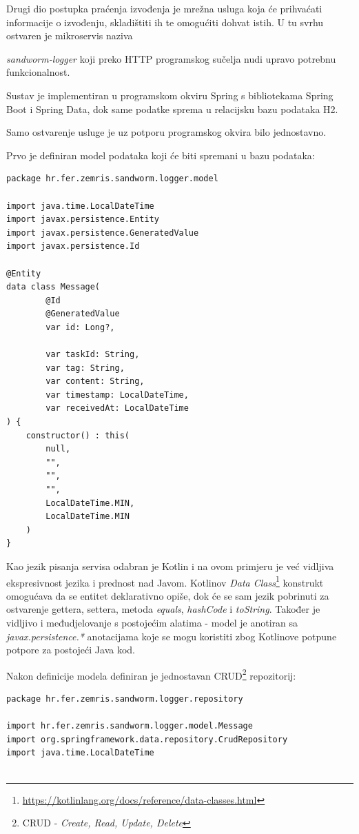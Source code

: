 \documentclass[times, utf8, zavrsni]{fer}
\begin{document}
Drugi dio postupka praćenja izvođenja je mrežna usluga koja će prihvaćati informacije o izvođenju, skladištiti ih te omogućiti dohvat istih. U tu svrhu ostvaren je mikroservis naziva {\textit{sandworm-logger} koji preko HTTP programskog sučelja nudi upravo potrebnu funkcionalnost.

Sustav je implementiran u programskom okviru Spring s bibliotekama Spring Boot i Spring Data, dok same podatke sprema u relacijsku bazu podataka H2.

Samo ostvarenje usluge je uz potporu programskog okvira bilo jednostavno.

Prvo je definiran model podataka koji će biti spremani u bazu podataka:

\begin{lstlisting}
package hr.fer.zemris.sandworm.logger.model

import java.time.LocalDateTime
import javax.persistence.Entity
import javax.persistence.GeneratedValue
import javax.persistence.Id

@Entity
data class Message(
        @Id
        @GeneratedValue
        var id: Long?,

        var taskId: String,
        var tag: String,
        var content: String,
        var timestamp: LocalDateTime,
        var receivedAt: LocalDateTime
) {
    constructor() : this(
	 	null,
		"",
		"",
		"",
		LocalDateTime.MIN,
		LocalDateTime.MIN
	)
}
\end{lstlisting}

Kao jezik pisanja servisa odabran je Kotlin i na ovom primjeru je već vidljiva ekspresivnost jezika i prednost nad Javom. Kotlinov {\textit{Data Class}}{\footnote{\url{https://kotlinlang.org/docs/reference/data-classes.html}}} konstrukt omogućava da se entitet deklarativno opiše, dok će se sam jezik pobrinuti za ostvarenje gettera, settera, metoda {\textit{equals}}, {\textit{hashCode}} i {\textit{toString}}. Također je vidljivo i međudjelovanje s postojećim alatima - model je anotiran sa {\textit{javax.persistence.*}} anotacijama koje se mogu koristiti zbog Kotlinove potpune potpore za postojeći Java kod.


Nakon definicije modela definiran je jednostavan CRUD{\footnote{CRUD - {\textit{Create, Read, Update, Delete}}}} repozitorij:

\begin{lstlisting}
package hr.fer.zemris.sandworm.logger.repository

import hr.fer.zemris.sandworm.logger.model.Message
import org.springframework.data.repository.CrudRepository
import java.time.LocalDateTime


\end{lstlisting}}
\end{document}
